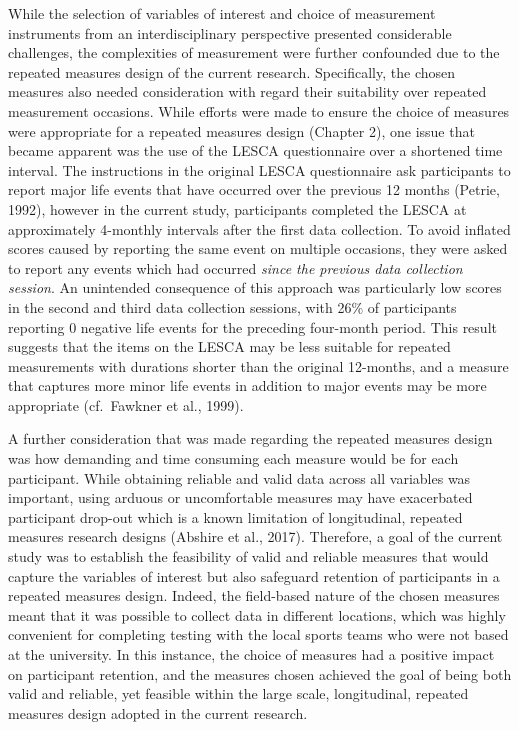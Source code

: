\documentclass[
  english,
  man,floatsintext]{apa6}
\begin{document}
While the selection of variables of interest and choice of measurement instruments from an interdisciplinary perspective presented considerable challenges, the complexities of measurement were further confounded due to the repeated measures design of the current research.
Specifically, the chosen measures also needed consideration with regard their suitability over repeated measurement occasions.
While efforts were made to ensure the choice of measures were appropriate for a repeated measures design (Chapter 2), one issue that became apparent was the use of the LESCA questionnaire over a shortened time interval.
The instructions in the original LESCA questionnaire ask participants to report major life events that have occurred over the previous 12 months (Petrie, 1992),
however in the current study, participants completed the LESCA at approximately 4-monthly intervals after the first data collection.
To avoid inflated scores caused by reporting the same event on multiple occasions,
they were asked to report any events which had occurred \emph{since the previous data collection session}.
An unintended consequence of this approach was particularly low scores in the second and third data collection sessions, with 26\% of participants reporting 0 negative life events for the preceding four-month period.
This result suggests that the items on the LESCA may be less suitable for repeated measurements with durations shorter than the original 12-months, and a measure that captures more minor life events in addition to major events may be more appropriate (cf.~Fawkner et al., 1999).

A further consideration that was made regarding the repeated measures design was how demanding and time consuming each measure would be for each participant.
While obtaining reliable and valid data across all variables was important, using arduous or uncomfortable measures may have exacerbated participant drop-out which is a known limitation of longitudinal, repeated measures research designs (Abshire et al., 2017).
Therefore, a goal of the current study was to establish the feasibility of valid and reliable measures that would capture the variables of interest but also safeguard retention of participants in a repeated measures design.
Indeed, the field-based nature of the chosen measures meant that it was possible to collect data in different locations, which was highly convenient for completing testing with the local sports teams who were not based at the university.
In this instance, the choice of measures had a positive impact on participant retention, and the measures chosen achieved the goal of being both valid and reliable, yet feasible within the large scale, longitudinal, repeated measures design adopted in the current research.
\end{document}
